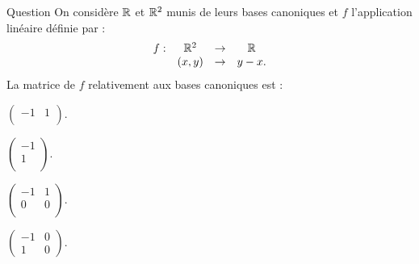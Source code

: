 

\begin{multi}[multiple,feedback=
{Soit \({\cal {B}}=\{e_1,e_2\}\) et \({\cal {B}}'=\{1\}\) les bases canoniques de \(\Rr^2\) et \(\Rr\) 
respectivement. La matrice de \(f\) relativement à ces bases est la matrice dont la \(1\)ère colonne est \(f(e_1)=-1\) et la 2ème colonne est \(f(e_2)=1\). Cette matrice est : \(\left(\begin{array}{rc}
-1&1\\ \end{array}\right).\)
}]{Question}
On considère \(\Rr\) et \(\Rr^2\) munis de leurs bases canoniques et \(f\) l'application linéaire définie par :
\[\begin{array}{rccc}f:&\mathbb{R}^2 &\to& \mathbb{R}\\
& (x,y)&\to &y-x.  \end{array}\]
La matrice de \(f\) relativement aux bases canoniques est :

    \item* \(\left(\begin{array}{rc}
-1&1\\
\end{array}\right).\)
    \item \(\left(\begin{array}{r}
-1\\
1\\
\end{array}\right).\)
    \item \(\left(\begin{array}{rc}
-1&1\\
0&0\\
\end{array}\right).\)
    \item \(\left(\begin{array}{rcc}
-1&0\\
1&0\end{array}\right).\)
\end{multi}


